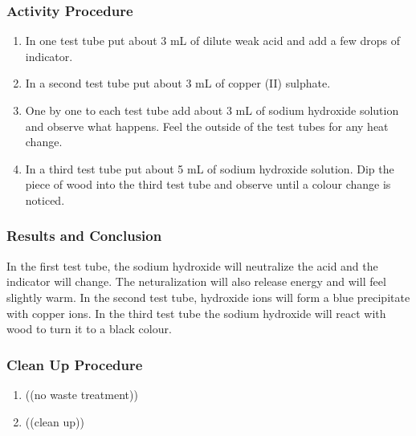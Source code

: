 \subsubsection*{Activity Procedure}
\begin{enumerate}
\item{In one test tube put about 3 mL of dilute weak acid and add a few drops of indicator.}
\item{ In a second test tube put about 3 mL of copper (II) sulphate.}
\item{One by one to each test tube add about 3 mL of sodium hydroxide solution and observe what happens. Feel the outside of the test tubes for any heat change.}
\item{In a third test tube put about 5 mL of sodium hydroxide solution. Dip the piece of wood into the third test tube and observe until a colour change is noticed.}
\end{enumerate}

\subsubsection*{Results and Conclusion}
In the first test tube, the sodium hydroxide will neutralize the acid and the indicator will change. The neturalization will also release energy and will feel slightly warm.
In the second test tube, hydroxide ions will form a blue precipitate with copper ions.
In the third test tube the sodium hydroxide will react with wood to turn it to a black colour.

\subsubsection*{Clean Up Procedure}
\begin{enumerate}
\item{((no waste treatment))}
\item{((clean up))}
\end{enumerate}
